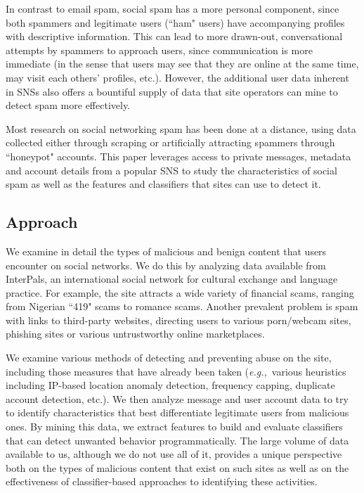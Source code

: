\documentclass[preprint]{acm_proc_article-sp}
\newcommand{\eg}{{\em e.g.,}~}
\begin{document}
In contrast to email spam, social spam has a more personal component, since both spammers 
and legitimate users (``ham" users) have accompanying profiles with descriptive information. This can 
lead to more drawn-out, conversational attempts by spammers to approach users, since communication 
is more immediate (in the sense that users may see that they are online at the same time, may 
visit each others' profiles, etc.). However, the additional user data inherent in SNSs also 
offers a bountiful supply of data that site operators can mine to detect spam more effectively.

Most research on social networking spam has been done at a distance, using data collected 
either through scraping or artificially attracting spammers through ``honeypot" accounts. This 
paper leverages access to private messages, metadata and account details from a popular SNS 
to study the characteristics of social spam as well as the features and classifiers that 
sites can use to detect it.

\subsection{Approach}

We examine in detail the types of malicious and benign
content that users encounter on social networks. We do this by analyzing
data available from InterPals, an international social network
for cultural exchange and language practice. For example, the site
attracts a wide variety of financial scams, ranging from Nigerian
``419" scams to romance scams. Another prevalent problem is spam with
links to third-party websites, directing users to various porn/webcam
sites, phishing sites or various untrustworthy online marketplaces.

We examine various methods of detecting and preventing abuse
on the site, including those measures that have already been taken
(\eg various heuristics including IP-based location anomaly detection,
frequency capping, duplicate account detection, etc.). We then analyze 
message and user account data to try to identify characteristics that 
best differentiate legitimate users from malicious ones. By mining this data, 
 we extract features to build and evaluate classifiers that can detect unwanted behavior 
programmatically. The large volume of data available to us, although we do 
not use all of it, provides a unique perspective both on the types of
malicious content that exist on such sites as well as on the
effectiveness of classifier-based approaches to identifying
these activities.
\end{document}
